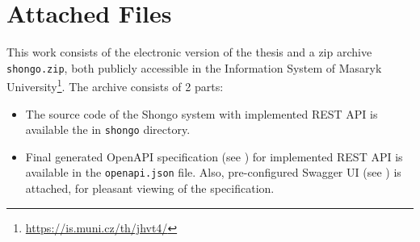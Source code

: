 \chapter{Attached Files} \label{apx:files}
This work consists of the electronic version of the thesis and a zip archive \texttt{shongo.zip}, both publicly accessible in the Information System of Masaryk University\footnote{\url{https://is.muni.cz/th/jhvt4/}}.
The archive consists of 2 parts:
\begin{itemize}
    \item The source code of the Shongo system with implemented REST API is available the in \texttt{shongo} directory.
    \item Final generated OpenAPI specification (see ) for implemented REST API is available in the \texttt{openapi.json} file. Also, pre-configured Swagger UI (see ) is attached, for pleasant viewing of the specification.
\end{itemize}
